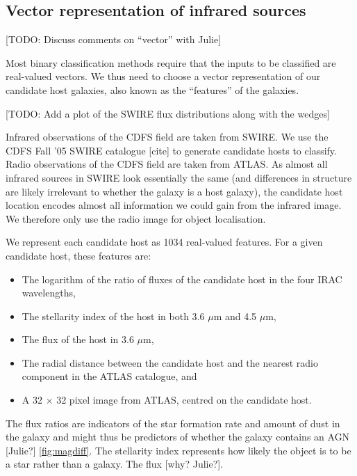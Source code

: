 \documentclass[fleqn,usenatbib,usedcolumn]{mnras}
\begin{document}
  \subsection{Vector representation of infrared
  sources}\label{vector-representation-of-infrared-sources}

    {[}TODO: Discuss comments on ``vector'' with Julie{]}

    Most binary classification methods require that the inputs to be
    classified are real-valued vectors. We thus need to choose a vector
    representation of our candidate host galaxies, also known as the
    ``features'' of the galaxies.

    {[}TODO: Add a plot of the SWIRE flux distributions along with the
    wedges{]}

    Infrared observations of the CDFS field are taken from SWIRE. We use the
    CDFS Fall '05 SWIRE catalogue {[}cite{]} to generate candidate hosts to
    classify. Radio observations of the CDFS field are taken from ATLAS. As
    almost all infrared sources in SWIRE look essentially the same (and
    differences in structure are likely irrelevant to whether the galaxy is
    a host galaxy), the candidate host location encodes almost all
    information we could gain from the infrared image. We therefore only use
    the radio image for object localisation.

    We represent each candidate host as 1034 real-valued features. For a given
    candidate host, these features are:
    \begin{itemize}
      \item The logarithm of the ratio of fluxes of the candidate host in the
        four IRAC wavelengths,
      \item The stellarity index of the host in both 3.6 $\mu$m and 4.5
        $\mu$m,
      \item The flux of the host in 3.6 $\mu$m,
      \item The radial distance between the candidate host and the nearest
        radio component in the ATLAS catalogue, and
      \item A 32 $\times$ 32 pixel image from ATLAS, centred on the candidate
        host.
    \end{itemize}

    The flux ratios are indicators of the star formation rate and amount of
    dust in the galaxy and might thus be predictors of whether the galaxy
    contains an AGN {[}Julie?{]} \ref{fig:magdiff}. The stellarity index
    represents how likely the object is to be a star rather than a galaxy.
    The flux {[}why? Julie?{]}.
\end{document}
